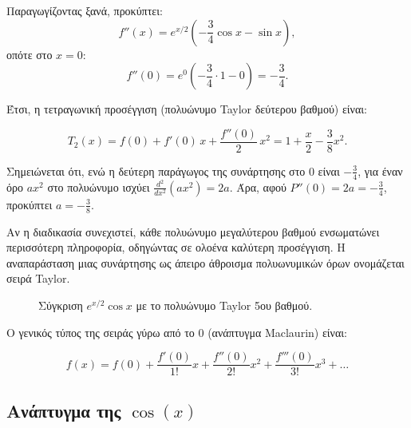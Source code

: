 \documentclass[a4paper, 11pt]{article}
\begin{document}
Παραγωγίζοντας ξανά, προκύπτει: \[
f''(x) =  e^{x/2} \left( -\frac{3}{4}\cos x - \sin x \right),
\] οπότε στο \(x=0\): \[
f''(0) = e^{0} \left( -\frac{3}{4} \cdot 1 - 0 \right) = -\frac{3}{4}.
\]

Έτσι, η τετραγωνική προσέγγιση (πολυώνυμο Taylor δεύτερου βαθμού) είναι:

\[
\boxed{T_2(x) = f(0) + f'(0)\,x + \frac{f''(0)}{2}\,x^2 = 1 + \frac{x}{2} - \frac{3}{8}x^2}.
\]

Σημειώνεται ότι, ενώ η δεύτερη παράγωγος της συνάρτησης στο \(0\) είναι
\(-\frac{3}{4}\), για έναν όρο \(a x^2\) στο πολυώνυμο ισχύει
\(\frac{d^2}{dx^2}(a x^2)=2a\). Άρα, αφού \(P''(0)=2a=-\frac{3}{4}\),
προκύπτει \(a=-\frac{3}{8}\).

Αν η διαδικασία συνεχιστεί, κάθε πολυώνυμο μεγαλύτερου βαθμού
ενσωματώνει περισσότερη πληροφορία, οδηγώντας σε ολοένα καλύτερη
προσέγγιση. Η αναπαράσταση μιας συνάρτησης ως άπειρο άθροισμα
πολυωνυμικών όρων ονομάζεται σειρά Taylor.

\begin{figure}[htbp]
\centering
{}
\caption{Σύγκριση $e^{x/2}\cos x$ με το πολυώνυμο Taylor 5ου βαθμού.}
\label{fig:expcostaylor}
\end{figure}

Ο γενικός τύπος της σειράς γύρω από το \(0\) (ανάπτυγμα Maclaurin)
είναι:

\[f(x) = f(0) + \frac{f'(0)}{1!}x + \frac{f''(0)}{2!}x^2 + \frac{f'''(0)}{3!}x^3 + \dots\]

\subsection{\texorpdfstring{Ανάπτυγμα της
\(\cos(x)\)}{Ανάπτυγμα της \textbackslash cos(x)}}\label{ux3b1ux3bdux3acux3c0ux3c4ux3c5ux3b3ux3bcux3b1-ux3c4ux3b7ux3c2-cosx}
\end{document}
